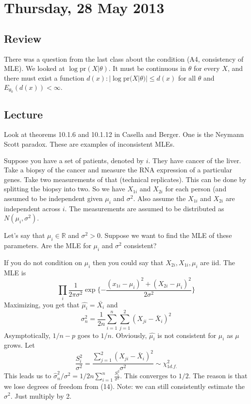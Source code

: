 \documentclass[letterpaper, 12pt]{article}
\theoremstyle{definition}
\theoremstyle{plain}
\newcommand{\pr}{\text{pr}}
\newcommand{\R}{\mathbb{R}}
\newcommand{\sion}{\sum_{i=1}^n}
\begin{document}
\section{Thursday, 28 May 2013}
\subsection*{Review}
There was a question from the last class about the condition (A4, consistency of MLE). We looked at $\log \pr (X | \theta)$. It must be continuous in  $\theta$ for every $X$, and there must exist a function $d(x) : |\log \pr(X | \theta)| \leq d(x)$ for all $\theta$ and $E_{\theta_0} (d(x)) < \infty$. 

\subsection*{Lecture}
Look at theorems 10.1.6 and 10.1.12 in Casella and Berger.
One is the Neymann Scott paradox. These are examples of 
inconsistent MLEs.

Suppose you have a set of patients, denoted by $i$. They have cancer of the liver. Take a biopsy of the cancer and measure the RNA expression of a particular genes. Take two measurements of that (technical replicates). This can be done by splitting the biopsy into two. So we have $X_{1i}$ and $X_{2i}$ for each person (and assumed to be independent given $\mu_i$ and $\sigma^2$. Also assume the $X_{1i}$ and $X_{2i}$ are independent across $i$. The measurements are assumed to be distributed as $N(\mu_i, \sigma^2)$.

Let's say that $\mu_i \in \R$ and $\sigma^2 > 0$. Suppose we want to find the MLE of these parameters. Are the MLE for $\mu_i$ and $\sigma^2$ consistent?

If you do not condition on $\mu_i$ then you could say that $X_{2i}, X_{1i}, \mu_i$ are iid. The MLE is 
\begin{equation}
\prod_i \frac{1}{2 \pi \sigma^2} \exp\{ - \frac{(x_{1i} - \mu_i  )^2 + (X_{2i} - \mu_i)^2}{2 \sigma^2} \}
\end{equation}
Maximizing, you get that $\hat{\mu_i} = \bar{X_i}$ and
\begin{equation}
\sigma^2_n = \frac{1}{2n} \sion \sum_{j=1}^2 (X_{ji} - \bar{X}_i) ^2
\end{equation}
Asymptotically, $1/n-p$ goes to $1/n$.
Obviously, $\hat{\mu_i}$ is not consistent for $\mu_i$ as $\mu$ grows.
Let 
\begin{equation}
\frac{S_i^2}{\sigma^2} = \frac{\sum_{j=1}^2 (X_{ji} - \bar{X}_i)^2}{\sigma^2} \sim \chi^2_{1 d.f.}
\end{equation}
This leads us to $\hat{\sigma}^2_n / \sigma^2 = 1/2n \sion \frac{S_i^2}{\sigma^2}$. This converges to $1/2$. The reason is that we lose degrees of freedom from (14).
Note: we can still consistently estimate the $\sigma^2$. Just multiply by 2.
\end{document}
